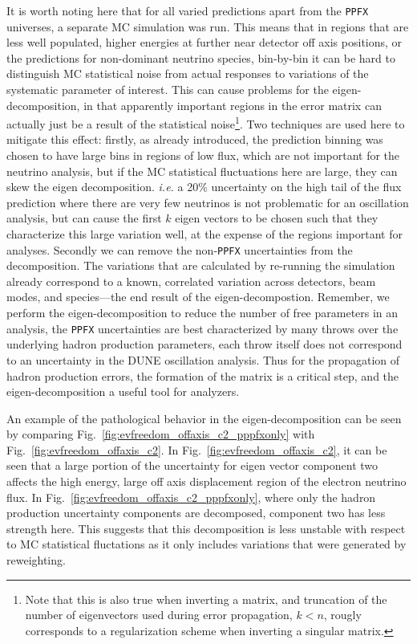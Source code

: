 \documentclass{article}
\begin{document}
It is worth noting here that for all varied predictions apart from the \texttt{PPFX} universes, a separate MC simulation was run. This means that in regions that are less well populated, higher energies at further near detector off axis positions, or the predictions for non-dominant neutrino species, bin-by-bin it can be hard to distinguish MC statistical noise from actual responses to variations of the systematic parameter of interest. This can cause problems for the eigen-decomposition, in that apparently important regions in the error matrix can actually just be a result of the statistical noise\footnote{Note that this is also true when inverting a matrix, and truncation of the number of eigenvectors used during error propagation, $k<n$, rougly corresponds to a regularization scheme when inverting a singular matrix.}. Two techniques are used here to mitigate this effect: firstly, as already introduced, the prediction binning was chosen to have large bins in regions of low flux, which are not important for the neutrino analysis, but if the MC statistical fluctuations here are large, they can skew the eigen decomposition. \emph{i.e.} a 20\% uncertainty on the high tail of the flux prediction where there are very few neutrinos is not problematic for an oscillation analysis, but can cause the first $k$ eigen vectors to be chosen such that they characterize this large variation well, at the expense of the regions important for analyses. Secondly we can remove the non-\texttt{PPFX} uncertainties from the decomposition. The variations that are calculated by re-running the simulation already correspond to a known, correlated variation across detectors, beam modes, and species---the end result of the eigen-decompostion. Remember, we perform the eigen-decomposition to reduce the number of free parameters in an analysis, the \texttt{PPFX} uncertainties are best characterized by many throws over the underlying hadron production parameters, each throw itself does not correspond to an uncertainty in the DUNE oscillation analysis. Thus for the propagation of hadron production errors, the formation of the matrix is a critical step, and the eigen-decomposition a useful tool for analyzers. 

An example of the pathological behavior in the eigen-decomposition can be seen by comparing Fig.~\ref{fig:evfreedom_offaxis_c2_pppfxonly} with Fig.~\ref{fig:evfreedom_offaxis_c2}. In Fig.~\ref{fig:evfreedom_offaxis_c2}, it can be seen that a large portion of the uncertainty for eigen vector component two affects the high energy, large off axis displacement region of the electron neutrino flux. In Fig.~\ref{fig:evfreedom_offaxis_c2_pppfxonly}, where only the hadron production uncertainty components are decomposed, component two has less strength here. This suggests that this decomposition is less unstable with respect to MC statistical fluctations as it only includes variations that were generated by reweighting.
\end{document}
